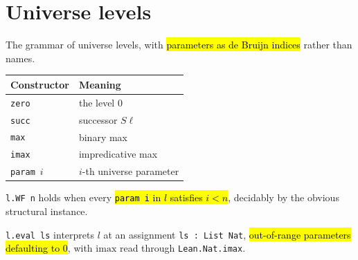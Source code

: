\section{Universe levels}

\begin{definition}
\label{ind:vlevel}
\leanok
{}

 The grammar of universe levels, with \hl{parameters as de Bruijn indices}
rather than names.
\par\smallskip\noindent
\begin{tabular}{ll}
\toprule
Constructor & Meaning \\
\midrule
\texttt{zero} & the level $0$ \\
\texttt{succ} & successor $S\ell$ \\
\texttt{max} & binary max \\
\texttt{imax} & impredicative max \\
\texttt{param}\ $i$ & $i$-th universe parameter \\
\bottomrule
\end{tabular}\par\smallskip
\end{definition}

\begin{definition}
\label{def:vlevel-wf}
\leanok
{}

 \texttt{l.WF n} holds when every \hl{\texttt{param i} in $l$ satisfies
$i<n$}, decidably by the obvious structural instance.
\end{definition}

\begin{definition}
\label{def:vlevel-eval}
\leanok
{}

 \texttt{l.eval ls} interprets $l$ at an assignment \texttt{ls : List Nat},
\hl{out-of-range parameters defaulting to $0$}, with $\mathrm{imax}$ read through
\texttt{Lean.Nat.imax}.
\end{definition}

